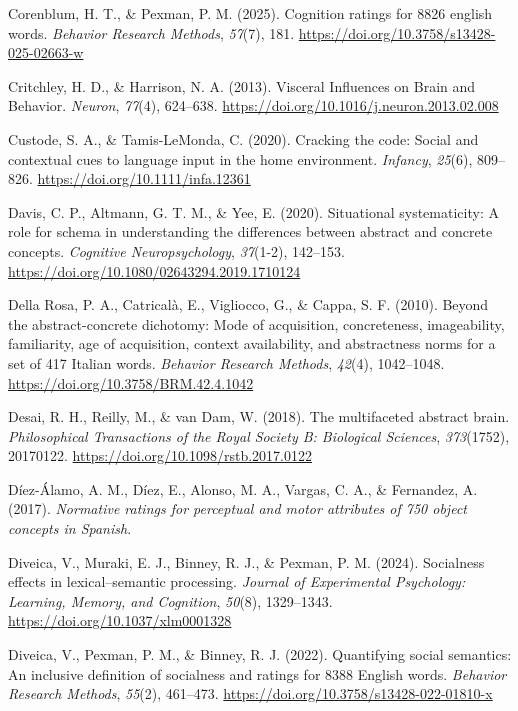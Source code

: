 \documentclass[
  man,floatsintext]{apa6}
\newlength{\cslhangindent}
\newenvironment{CSLReferences}[2] %
 {\begin{list}{}{%
  \setlength{\itemindent}{0pt}
  \setlength{\leftmargin}{0pt}
  \setlength{\parsep}{0pt}
  \ifodd #1
   \setlength{\leftmargin}{\cslhangindent}
   \setlength{\itemindent}{-1\cslhangindent}
  \fi
  \setlength{\itemsep}{#2\baselineskip}}}
 {\end{list}}
\begin{document}
\begin{CSLReferences}{1}{0}
Corenblum, H. T., \& Pexman, P. M. (2025). Cognition ratings for 8826 english words. \emph{Behavior Research Methods}, \emph{57}(7), 181. \url{https://doi.org/10.3758/s13428-025-02663-w}

Critchley, H. D., \& Harrison, N. A. (2013). Visceral {Influences} on {Brain} and {Behavior}. \emph{Neuron}, \emph{77}(4), 624--638. \url{https://doi.org/10.1016/j.neuron.2013.02.008}

Custode, S. A., \& Tamis-LeMonda, C. (2020). Cracking the code: {Social} and contextual cues to language input in the home environment. \emph{Infancy}, \emph{25}(6), 809--826. \url{https://doi.org/10.1111/infa.12361}

Davis, C. P., Altmann, G. T. M., \& Yee, E. (2020). Situational systematicity: {A} role for schema in understanding the differences between abstract and concrete concepts. \emph{Cognitive Neuropsychology}, \emph{37}(1-2), 142--153. \url{https://doi.org/10.1080/02643294.2019.1710124}

Della Rosa, P. A., Catricalà, E., Vigliocco, G., \& Cappa, S. F. (2010). Beyond the abstract-concrete dichotomy: Mode of acquisition, concreteness, imageability, familiarity, age of acquisition, context availability, and abstractness norms for a set of 417 {Italian} words. \emph{Behavior Research Methods}, \emph{42}(4), 1042--1048. \url{https://doi.org/10.3758/BRM.42.4.1042}

Desai, R. H., Reilly, M., \& van Dam, W. (2018). The multifaceted abstract brain. \emph{Philosophical Transactions of the Royal Society B: Biological Sciences}, \emph{373}(1752), 20170122. \url{https://doi.org/10.1098/rstb.2017.0122}

Díez-Álamo, A. M., Díez, E., Alonso, M. A., Vargas, C. A., \& Fernandez, A. (2017). \emph{Normative ratings for perceptual and motor attributes of 750 object concepts in {Spanish}}.

Diveica, V., Muraki, E. J., Binney, R. J., \& Pexman, P. M. (2024). Socialness effects in lexical--semantic processing. \emph{Journal of Experimental Psychology: Learning, Memory, and Cognition}, \emph{50}(8), 1329--1343. \url{https://doi.org/10.1037/xlm0001328}

Diveica, V., Pexman, P. M., \& Binney, R. J. (2022). Quantifying social semantics: {An} inclusive definition of socialness and ratings for 8388 {English} words. \emph{Behavior Research Methods}, \emph{55}(2), 461--473. \url{https://doi.org/10.3758/s13428-022-01810-x}


\end{CSLReferences}
\end{document}
